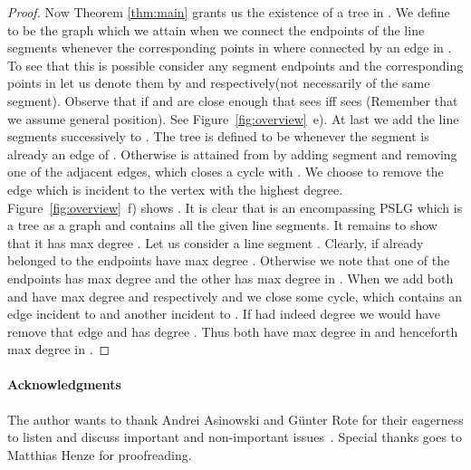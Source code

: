 \documentclass[12pt]{article}
\begin{document}
\begin{proof}
Now Theorem \ref{thm:main} grants us the existence of a tree  in . We define  to be the graph which we attain when we connect the endpoints of the line segments whenever the corresponding points in  where connected by an edge in . To see that this is possible consider any  segment endpoints  and the corresponding points in  let us denote them by  and  respectively(not necessarily of the same segment). Observe that if  and  are close enough that  sees  iff  sees  (Remember that we assume general position).
See Figure~\ref{fig:overview}~e). 
At last we add the line segments successively to . The tree  is defined to be  whenever the segment  is already an edge of . Otherwise  is attained from  by adding segment  and removing one of the adjacent edges, which closes a cycle with . We choose to remove the edge which is incident to the vertex with the highest degree. Figure~\ref{fig:overview}~f) shows .
It is clear that  is an encompassing PSLG which is a tree as a graph and contains all the given line segments. It remains to show that it has max degree . 
Let us consider a line segment . Clearly, if  already belonged to  the endpoints have max degree . Otherwise we note that one of the endpoints  has max degree  and the other  has max degree  in . When we add  both  and  have max degree  and  respectively and we close some cycle, which contains an edge incident to  and another incident to . If  had indeed degree  we would have remove that edge and  has degree . Thus both have max degree  in  and henceforth max degree  in .
\end{proof}


\paragraph{Acknowledgments}
The author wants to thank Andrei Asinowski and G\"{u}nter Rote for their eagerness to listen and discuss important and non-important issues~\smiley. Special thanks goes to Matthias Henze for proofreading.




\end{document}
